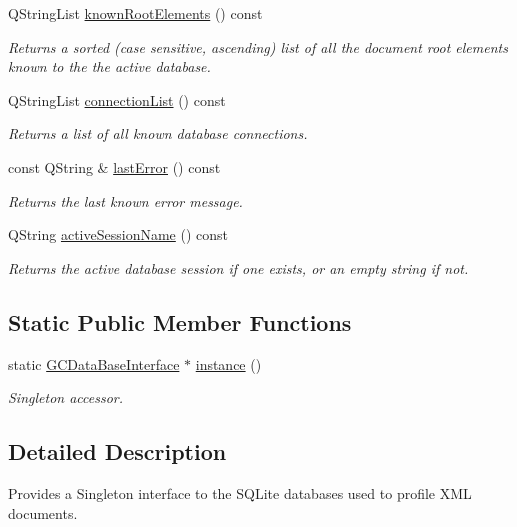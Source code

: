 \begin{DoxyCompactItemize}
\-Q\-String\-List \hyperlink{class_g_c_data_base_interface_ac5c57277f9476ab74cfe13fbcee52f15}{known\-Root\-Elements} () const 
\begin{DoxyCompactList}\small\item\em \-Returns a sorted (case sensitive, ascending) list of all the document root elements known to the the active database. \end{DoxyCompactList}\item 
\-Q\-String\-List \hyperlink{class_g_c_data_base_interface_ab34f716b89ee96de9bf599f5d5d2c152}{connection\-List} () const 
\begin{DoxyCompactList}\small\item\em \-Returns a list of all known database connections. \end{DoxyCompactList}\item 
const \-Q\-String \& \hyperlink{class_g_c_data_base_interface_a30d5bbea06462c5ed0f76ad8a68c4b08}{last\-Error} () const 
\begin{DoxyCompactList}\small\item\em \-Returns the last known error message. \end{DoxyCompactList}\item 
\-Q\-String \hyperlink{class_g_c_data_base_interface_a53aff43e5997c5f0180ba214205e5bc6}{active\-Session\-Name} () const 
\begin{DoxyCompactList}\small\item\em \-Returns the active database session if one exists, or an empty string if not. \end{DoxyCompactList}\end{DoxyCompactItemize}
\subsection*{\-Static \-Public \-Member \-Functions}
\begin{DoxyCompactItemize}
\item 
static \hyperlink{class_g_c_data_base_interface}{\-G\-C\-Data\-Base\-Interface} $\ast$ \hyperlink{class_g_c_data_base_interface_a1baea9c0667aa8b610ec30076fcab84c}{instance} ()
\begin{DoxyCompactList}\small\item\em \-Singleton accessor. \end{DoxyCompactList}\end{DoxyCompactItemize}


\subsection{\-Detailed \-Description}
\-Provides a \-Singleton interface to the \-S\-Q\-Lite databases used to profile \-X\-M\-L documents. 

